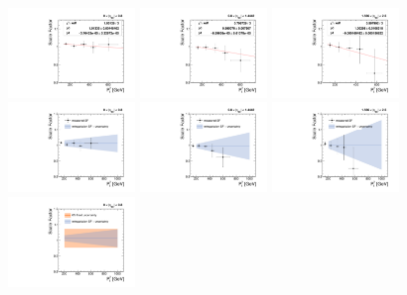 \begin{figure}[!htbp]
  \centering
  \includegraphics[width=0.3\textwidth]{fig/Extrapolate_2016_0_Fit.pdf}
  \includegraphics[width=0.3\textwidth]{fig/Extrapolate_2016_1_Fit.pdf}
  \includegraphics[width=0.3\textwidth]{fig/Extrapolate_2016_2_Fit.pdf}\\
  \includegraphics[width=0.3\textwidth]{fig/Extrapolate_2016_0_Check.pdf}
  \includegraphics[width=0.3\textwidth]{fig/Extrapolate_2016_1_Check.pdf}
  \includegraphics[width=0.3\textwidth]{fig/Extrapolate_2016_2_Check.pdf}\\
  \includegraphics[width=0.3\textwidth]{fig/Extrapolate_2016_0_Compare.pdf}

\end{figure}
